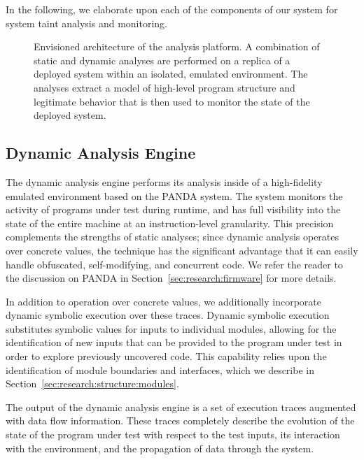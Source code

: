 \documentclass[letterpaper,twoside,11pt,headings=small]{scrartcl}
\newcommand{\dynamicsys}{\textsc{PANDA}\xspace}
\begin{document}
In the following, we elaborate upon each of the components of our system for
system taint analysis and monitoring.

\begin{figure}[t]
    \centering
    \caption{Envisioned architecture of the analysis platform.
    A combination of static and dynamic analyses are performed on a replica
    of a deployed system within an isolated, emulated environment.
    The analyses extract a model of high-level program structure and
    legitimate behavior that is then used to monitor the state of the
    deployed system.}
    \label{fig:decomposition-arch}
\end{figure}

\subsection{Dynamic Analysis Engine}

The dynamic analysis engine performs its analysis inside of a high-fidelity
emulated environment based on the \dynamicsys system.  The system monitors the
activity of programs under test during runtime, and has full visibility into
the state of the entire machine at an instruction-level granularity.  This
precision complements the strengths of static analyses; since dynamic analysis
operates over concrete values, the technique has the significant advantage
that it can easily handle obfuscated, self-modifying, and concurrent code.  We
refer the reader to the discussion on \dynamicsys in
Section~\ref{sec:research:firmware} for more details.

In addition to operation over concrete values, we additionally incorporate
dynamic symbolic execution over these traces.  Dynamic symbolic execution
substitutes symbolic values for inputs to individual modules, allowing for the
identification of new inputs that can be provided to the program under test in
order to explore previously uncovered code.  This capability relies upon the
identification of module boundaries and interfaces, which we describe in
Section~\ref{sec:research:structure:modules}.

The output of the dynamic analysis engine is a set of execution traces
augmented with data flow information.  These traces completely describe the
evolution of the state of the program under test with respect to the test
inputs, its interaction with the environment, and the propagation of data
through the system.
\end{document}
